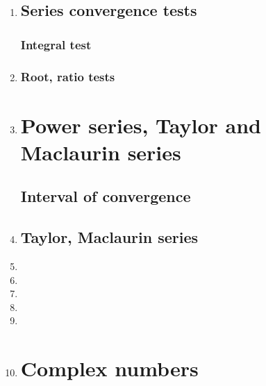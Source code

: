 \documentclass{article}
\begin{document}
\begin{enumerate}
\item 


\subsection{Series convergence tests}
\subsubsection{Integral test}
\item 
\subsubsection{Root, ratio tests}
\item 

\section{Power series, Taylor and Maclaurin series}
\subsection{Interval of convergence}
\item 
\subsection{Taylor, Maclaurin series}
\item 
\item 
\item 
\item 
\item 
\item 
\section{Complex numbers}



\end{enumerate}
\end{document}
